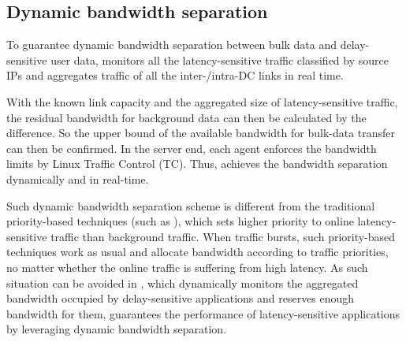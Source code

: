 %
%
%
%

\subsection{Dynamic bandwidth separation}
\label{subsec:system:separation}

To guarantee dynamic bandwidth separation between bulk data and delay-sensitive user data, \name monitors all the latency-sensitive traffic classified by source IPs and aggregates traffic of all the inter-/intra-DC links in real time.

With the known link capacity and the aggregated size of latency-sensitive traffic, the residual bandwidth for background data can then be calculated by the difference. So the upper bound of the available bandwidth for bulk-data transfer can then be confirmed. In the server end, each agent enforces the bandwidth limits by Linux Traffic Control (TC). Thus, \name achieves the bandwidth separation dynamically and in real-time.

Such dynamic bandwidth separation scheme is different from the traditional priority-based techniques (such as \cite{kumar2015bwe}), which sets higher priority to online latency-sensitive traffic than background traffic. When traffic bursts, such priority-based techniques work as usual and allocate bandwidth according to traffic priorities, no matter whether the online traffic is suffering from high latency. As such situation can be avoided in \name, which dynamically monitors the aggregated bandwidth occupied by delay-sensitive applications and reserves enough bandwidth for them, \name guarantees the performance of latency-sensitive applications by leveraging dynamic bandwidth separation.


